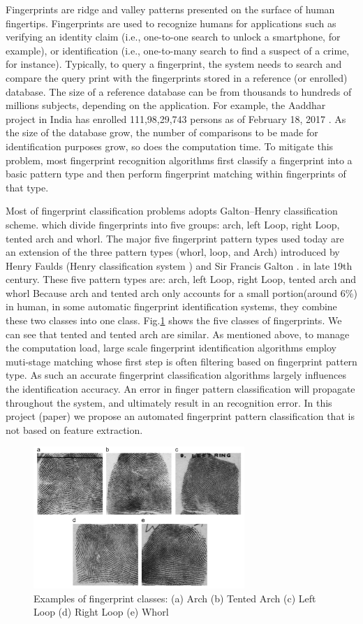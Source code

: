 

Fingerprints are ridge and valley patterns presented on the surface of human fingertips.
%
Fingerprints are used to recognize humans for applications such as verifying an identity claim (i.e., one-to-one search to  unlock a smartphone, for example), or identification (i.e., one-to-many search to find a suspect of a crime, for instance).
%
Typically, to query a fingerprint, the system needs to search and compare the query print with the fingerprints stored in a reference (or enrolled) database.  The size of a reference database can be from thousands to hundreds of millions subjects, depending on the application. For example, the Aaddhar project in India has enrolled  111,98,29,743 persons as of February 18, 2017 \cite{aaddhar}. 
%
As the size of the database grow, the number of comparisons to be made for identification purposes grow, so does the computation time.
%
To mitigate this problem, most fingerprint recognition algorithms first classify a fingerprint into a basic pattern type and then perform fingerprint matching within fingerprints of that type.
%

%
Most of fingerprint classification problems adopts Galton–Henry classification scheme.\cite{henry1905classification} which divide fingerprints into five groups: arch, left Loop, right Loop, tented arch and whorl. 
The major five fingerprint pattern types used today are an extension of the three pattern types (whorl, loop, and Arch) introduced by Henry Faulds (Henry classification system \cite{henry1905classification}) and Sir Francis Galton \cite{galton1892}. in late 19th century. These five pattern types are: arch, left Loop, right Loop, tented arch and whorl
%
Because arch and tented arch only accounts for a small portion(around 6\%) in human, in some automatic fingerprint identification systems, they combine these two classes into one class. 
%
Fig.\ref{fig.fingerprint_classes} shows the five classes of fingerprints. We can see that tented and tented arch are similar.
%
As mentioned above, to manage the computation load, large scale fingerprint identification algorithms employ muti-stage matching whose first step is often filtering based on fingerprint pattern type. As such an accurate fingerprint classification algorithms largely influences the identification accuracy. An error in finger pattern classification will propagate throughout the system, and ultimately result in an recognition error. In this project (paper) we propose an automated fingerprint pattern classification that is not based on feature extraction.

\begin{figure}[!ht]
	\begin{center}
		\includegraphics[width=8cm]{fig/Fingerprint_classes.png}
	\end{center}
	\caption{Examples of fingerprint classes: (a) Arch (b) Tented Arch (c) Left Loop (d) Right Loop  (e) Whorl \cite{cao2013fingerprint}} 
	\label{fig.fingerprint_classes}
\end{figure}

